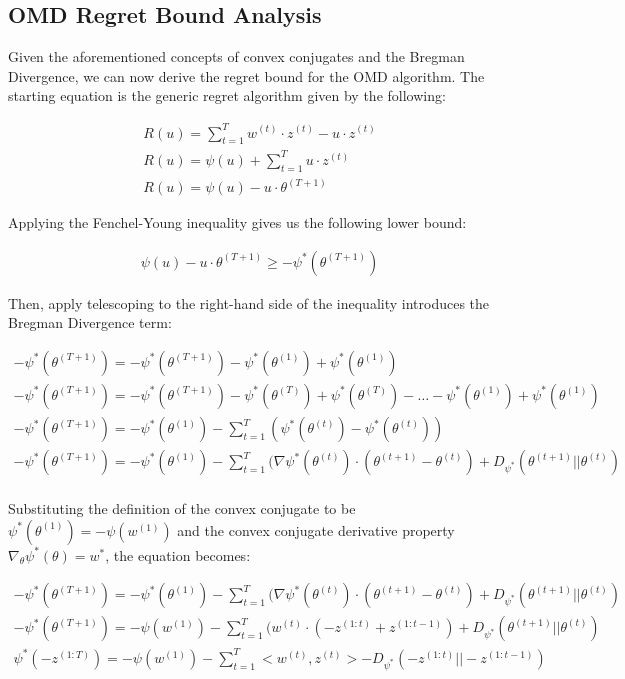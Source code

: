 \documentclass[11pt]{article}
\begin{document}
\subsection{OMD Regret Bound Analysis}

Given the aforementioned concepts of convex conjugates and the Bregman Divergence, we can now derive the regret bound for the OMD algorithm. The starting equation is the generic regret algorithm given by the following:

\begin{gather*}
    R(u) = \sum_{t=1}^T w^{(t)} \cdot z^{(t)}  - u \cdot z^{(t)}\\ 
    R(u) = \psi (u) + \sum_{t=1}^T u \cdot z^{(t)} \\ 
    R(u) = \psi (u) - u \cdot \theta^{(T+1)}
\end{gather*}

Applying the Fenchel-Young inequality gives us the following lower bound:

\begin{gather*}
    \psi (u) - u \cdot \theta^{(T+1)} \geq -\psi^* (\theta^{(T+1)})
\end{gather*}

Then, apply telescoping to the right-hand side of the inequality introduces the Bregman Divergence term:

\begin{gather*}
    -\psi^* (\theta^{(T+1)}) = -\psi^* (\theta^{(T+1)}) - \psi^* (\theta^{(1)}) + \psi^* (\theta^{(1)}) \\
    -\psi^* (\theta^{(T+1)}) = -\psi^* (\theta^{(T+1)}) - \psi^* (\theta^{(T)}) + \psi^* (\theta^{(T)}) - \dots - \psi^* (\theta^{(1)}) + \psi^* (\theta^{(1)}) \\ 
    -\psi^* (\theta^{(T+1)}) = - \psi^* (\theta^{(1)}) - \sum_{t=1}^T (\psi^* (\theta^{(t)}) - \psi^* (\theta^{(t)})) \\ 
    -\psi^* (\theta^{(T+1)}) = - \psi^* (\theta^{(1)}) - \sum_{t=1}^T (\nabla \psi^* (\theta^{(t)}) \cdot (\theta^{(t+1)} - \theta^{(t)}) + D_{\psi^*} (\theta^{(t+1)}||\theta^{(t)}) \\
\end{gather*}

Substituting the definition of the convex conjugate to be $\psi^* (\theta^{(1)}) = -\psi (w^{(1)})$ and the convex conjugate derivative property $\nabla_\theta \psi^* (\theta) = w^*$, the equation becomes:

\begin{gather*}
    -\psi^* (\theta^{(T+1)}) = - \psi^* (\theta^{(1)}) - \sum_{t=1}^T (\nabla \psi^* (\theta^{(t)}) \cdot (\theta^{(t+1)} - \theta^{(t)}) + D_{\psi^*} (\theta^{(t+1)}||\theta^{(t)}) \\
    -\psi^* (\theta^{(T+1)}) = - \psi (w^{(1)}) - \sum_{t=1}^T (w^{(t)} \cdot (-z^{(1:t)} + z^{(1:t-1)}) + D_{\psi^*} (\theta^{(t+1)}||\theta^{(t)}) \\ 
    \psi^* (-z^{(1:T)}) = -\psi (w^{(1)}) - \sum_{t=1}^T <w^{(t)}, z^{(t)}> - D_{\psi^*} (-z^{(1:t)}||-z^{(1:t-1)}) \\ 
\end{gather*}
\end{document}
